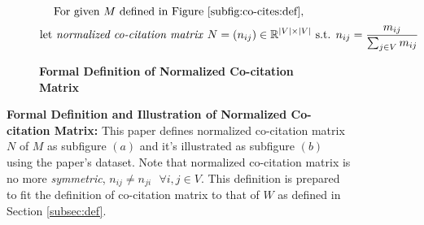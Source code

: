 \begin{figure}[t!]
    \begin{subfigure}[b]{1\textwidth}
        \[\text{For given $M$ defined in Figure \ref{subfig:co-cites:def},} \]
        \[\text{let \textit{normalized co-citation matrix} } N = (n_{ij}) \in \Bbb{R}^{|V| \times |V|} \text{ s.t. } n_{ij} = \frac{m_{ij}}{\sum_{j \in V}m_{ij}} \]
        \caption{\textbf{Formal Definition of Normalized Co-citation Matrix}}
        \label{subfig:co-cites:def:normal}
    \end{subfigure}
    \vfill
    \begin{subfigure}[b]{1\textwidth}
    \end{subfigure}
    \caption{\textbf{Formal Definition and Illustration of Normalized Co-citation Matrix:} This paper defines normalized co-citation matrix $N$ of $M$ as subfigure $(a)$ and it's illustrated as subfigure $(b)$ using the paper's dataset. Note that normalized co-citation matrix is no more \textit{symmetric}, $n_{ij} \neq n_{ji} \text{ } \forall i,j \in V$. This definition is prepared to fit the definition of co-citation matrix to that of $W$ as defined in Section \ref{subsec:def}.} 
    \label{fig:def-illus-normal-co-cites}
\end{figure}
